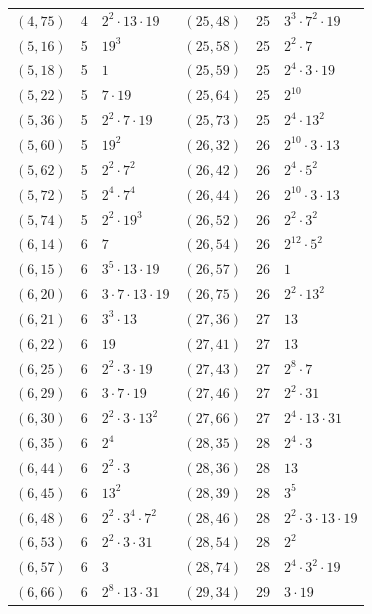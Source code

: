 \documentclass[11pt]{article}
\begin{document}
\begin{longtable}{@{}lrl@{\qquad}lrl@{}}
$(4,75)$ & 4 & $2^{2}\cdot 13\cdot 19$ & $(25,48)$ & 25 & $3^{3}\cdot 7^{2}\cdot 19$\\
$(5,16)$ & 5 & $19^{3}$ & $(25,58)$ & 25 & $2^{2}\cdot 7$\\
$(5,18)$ & 5 & $1$ & $(25,59)$ & 25 & $2^{4}\cdot 3\cdot 19$\\
$(5,22)$ & 5 & $7\cdot 19$ & $(25,64)$ & 25 & $2^{10}$\\
$(5,36)$ & 5 & $2^{2}\cdot 7\cdot 19$ & $(25,73)$ & 25 & $2^{4}\cdot 13^{2}$\\
$(5,60)$ & 5 & $19^{2}$ & $(26,32)$ & 26 & $2^{10}\cdot 3\cdot 13$\\
$(5,62)$ & 5 & $2^{2}\cdot 7^{2}$ & $(26,42)$ & 26 & $2^{4}\cdot 5^{2}$\\
$(5,72)$ & 5 & $2^{4}\cdot 7^{4}$ & $(26,44)$ & 26 & $2^{10}\cdot 3\cdot 13$\\
$(5,74)$ & 5 & $2^{2}\cdot 19^{3}$ & $(26,52)$ & 26 & $2^{2}\cdot 3^{2}$\\
$(6,14)$ & 6 & $7$ & $(26,54)$ & 26 & $2^{12}\cdot 5^{2}$\\
$(6,15)$ & 6 & $3^{5}\cdot 13\cdot 19$ & $(26,57)$ & 26 & $1$\\
$(6,20)$ & 6 & $3\cdot 7\cdot 13\cdot 19$ & $(26,75)$ & 26 & $2^{2}\cdot 13^{2}$\\
$(6,21)$ & 6 & $3^{3}\cdot 13$ & $(27,36)$ & 27 & $13$\\
$(6,22)$ & 6 & $19$ & $(27,41)$ & 27 & $13$\\
$(6,25)$ & 6 & $2^{2}\cdot 3\cdot 19$ & $(27,43)$ & 27 & $2^{8}\cdot 7$\\
$(6,29)$ & 6 & $3\cdot 7\cdot 19$ & $(27,46)$ & 27 & $2^{2}\cdot 31$\\
$(6,30)$ & 6 & $2^{2}\cdot 3\cdot 13^{2}$ & $(27,66)$ & 27 & $2^{4}\cdot 13\cdot 31$\\
$(6,35)$ & 6 & $2^{4}$ & $(28,35)$ & 28 & $2^{4}\cdot 3$\\
$(6,44)$ & 6 & $2^{2}\cdot 3$ & $(28,36)$ & 28 & $13$\\
$(6,45)$ & 6 & $13^{2}$ & $(28,39)$ & 28 & $3^{5}$\\
$(6,48)$ & 6 & $2^{2}\cdot 3^{4}\cdot 7^{2}$ & $(28,46)$ & 28 & $2^{2}\cdot 3\cdot 13\cdot 19$\\
$(6,53)$ & 6 & $2^{2}\cdot 3\cdot 31$ & $(28,54)$ & 28 & $2^{2}$\\
$(6,57)$ & 6 & $3$ & $(28,74)$ & 28 & $2^{4}\cdot 3^{2}\cdot 19$\\
$(6,66)$ & 6 & $2^{8}\cdot 13\cdot 31$ & $(29,34)$ & 29 & $3\cdot 19$\\

\end{longtable}
\end{document}
